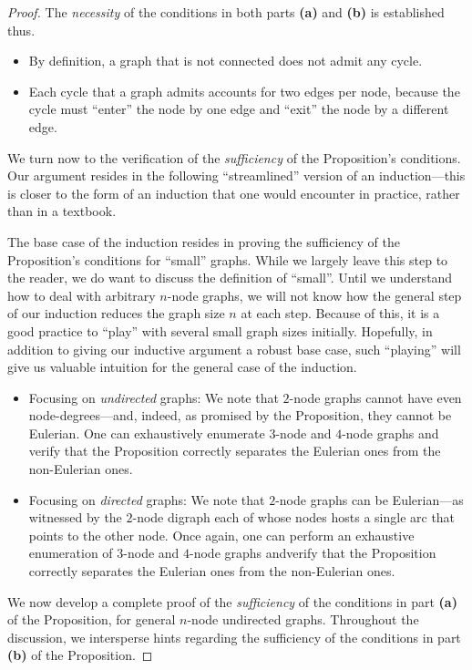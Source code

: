 \begin{proof}
The {\em necessity} of the conditions in both parts {\bf (a)} and {\bf
  (b)} is established thus.
\begin{itemize}
\item
By definition, a graph that is not connected does not admit any cycle.
\item
Each cycle that a graph admits accounts for two edges per node,
because the cycle must ``enter'' the node by one edge and ``exit'' the
node by a different edge.
\end{itemize}

\smallskip

\noindent
We turn now to the verification of the {\em sufficiency} of the
Proposition's conditions.  Our argument resides in the following
``streamlined'' version of an induction---this is closer to the form
of an induction that one would encounter in practice, rather than in a
textbook.

The base case of the induction resides in proving the sufficiency of
the Proposition's conditions for ``small'' graphs.  While we largely
leave this step to the reader, we do want to discuss the definition of
``small''.  Until we understand how to deal with arbitrary $n$-node
graphs, we will not know how the general step of our induction reduces
the graph size $n$ at each step.  Because of this, it is a good
practice to ``play'' with several small graph sizes initially.
Hopefully, in addition to giving our inductive argument a robust base
case, such ``playing'' will give us valuable intuition for the general
case of the induction.
\begin{itemize}
\item
Focusing on {\em undirected} graphs: We note that $2$-node graphs
cannot have even node-degrees---and, indeed, as promised by the
Proposition, they cannot be Eulerian.  One can exhaustively enumerate
$3$-node and $4$-node graphs and verify that the Proposition correctly
separates the Eulerian ones from the non-Eulerian ones.
\item
Focusing on {\em directed} graphs: We note that $2$-node graphs can be
Eulerian---as witnessed by the $2$-node digraph each of whose nodes
hosts a single arc that points to the other node.  Once again, one can
perform an exhaustive enumeration of $3$-node and $4$-node graphs
andverify that the Proposition correctly separates the Eulerian ones
from the non-Eulerian ones.
\end{itemize}

We now develop a complete proof of the {\em sufficiency} of the
conditions in part {\bf (a)} of the Proposition, for general $n$-node
undirected graphs.  Throughout the discussion, we intersperse hints
regarding the sufficiency of the conditions in part {\bf (b)} of the
Proposition.


\end{proof}
